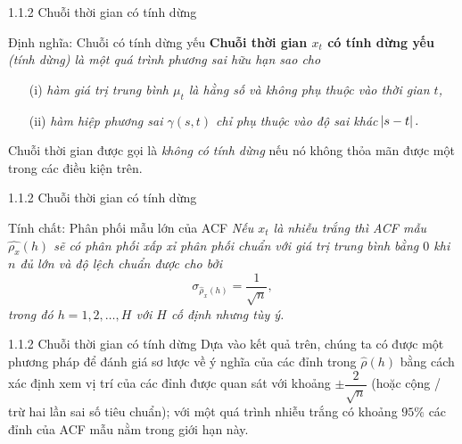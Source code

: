 \documentclass[notheorems,envcountsect,hyperref=unicode]{beamer}
\begin{document}
\begin{frame}{1.1.2 Chuỗi thời gian có tính dừng}
\begin{block}{Định nghĩa: Chuỗi có tính dừng yếu \cite{1}}
\textbf{Chuỗi thời gian $x_t$ có tính dừng yếu} \textit{(tính dừng) là một quá trình phương sai hữu hạn sao cho}
\begin{itemize}
	\item[(i)]\textit{hàm giá trị trung bình $\mu_{t}$ là hằng số và không phụ thuộc vào thời gian $t$,}
	\item[(ii)]\textit{hàm hiệp phương sai $ \gamma(s, t)$ chỉ phụ thuộc vào độ sai khác $ \abs{s-t}.$} \label{dntd}
\end{itemize}
\end{block}
 Chuỗi thời gian được gọi là \textit{không có tính dừng} nếu nó không thỏa mãn được một trong các điều kiện trên.
\end{frame}

\begin{frame}{1.1.2 Chuỗi thời gian có tính dừng}
	\begin{block}{Tính chất: Phân phối mẫu lớn của ACF \cite{1}}
	\textit{Nếu $ x_{t}$ là nhiễu trắng thì ACF mẫu $\widehat{\rho_{x}}(h)$ sẽ có phân phối xấp xỉ phân phối chuẩn với giá trị trung bình bằng $0$  khi $n$ đủ lớn và độ lệch chuẩn được cho bởi
	\begin{equation}
	\sigma_{\hat{\rho}_{x}(h)}=\dfrac{1}{\sqrt{n}}, \label{ct1.40}
	\end{equation}
	trong đó $h = 1, 2, \dots, H$ với $H$ cố định nhưng tùy ý.}
	\end{block}
\end{frame}

\begin{frame}{1.1.2 Chuỗi thời gian có tính dừng}
Dựa vào kết quả trên, chúng ta có được một phương pháp để đánh giá sơ lược về ý nghĩa của các đỉnh trong $\widehat{\rho}(h)$ bằng cách xác định xem vị trí của các đỉnh được quan sát với khoảng $\pm\dfrac{2}{\sqrt{n}}$ (hoặc cộng / trừ hai lần sai số tiêu chuẩn); với một quá trình nhiễu trắng có khoảng $95\%$ các đỉnh của ACF mẫu nằm trong giới hạn này.
\end{frame}
\end{document}
